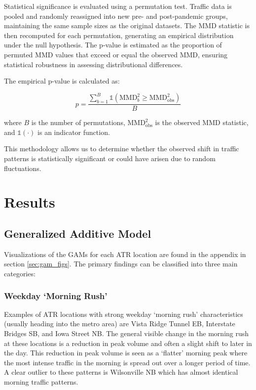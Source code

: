 \documentclass{article}
\begin{document}
Statistical significance is evaluated using a permutation test. Traffic data is pooled and randomly reassigned into new pre- and post-pandemic groups, maintaining the same sample sizes as the original datasets. The MMD statistic is then recomputed for each permutation, generating an empirical distribution under the null hypothesis. The p-value is estimated as the proportion of permuted MMD values that exceed or equal the observed MMD, ensuring statistical robustness in assessing distributional differences.

The empirical p-value is calculated as:

\[
    p = \frac{\sum_{b=1}^{B} \boldsymbol{\mathbb{1}}(\text{MMD}^2_b \geq \text{MMD}^2_{\text{obs}})}{B}
\]

where \( B \) is the number of permutations, \( \text{MMD}^2_{\text{obs}} \) is the observed MMD statistic, and \( \mathbb{1}(\cdot) \) is an indicator function.

This methodology allows us to determine whether the observed shift in traffic patterns is statistically significant or could have arisen due to random fluctuations.

\section{Results}

\subsection{Generalized Additive Model}

Visualizations of the GAMs for each ATR location are found in the appendix in section \ref{sec:gam_figs}. The primary findings can be classified into three main categories:

\subsubsection{Weekday `Morning Rush'}

Examples of ATR locations with strong weekday `morning rush' characteristics (usually heading into the metro area) are Vista Ridge Tunnel EB, Interstate Bridges SB, and Iowa Street NB. The general visible change in the morning rush at these locations is a reduction in peak volume and often a slight shift to later in the day. This reduction in peak volume is seen as a `flatter' morning peak where the most intense traffic in the morning is spread out over a longer period of time. A clear outlier to these patterns is Wilsonville NB which has almost identical morning traffic patterns. 
\end{document}

